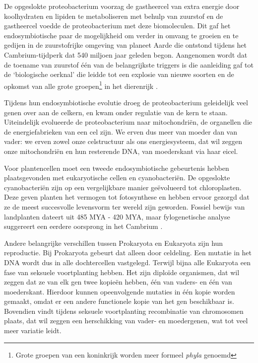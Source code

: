\documentclass[
  11pt,
]{book}
\begin{document}
De opgeslokte proteobacterium voorzag de gastheercel van extra energie door koolhydraten en lipiden te metaboliseren met behulp van zuurstof en de gastheercel voedde de proteobacterium met deze biomoleculen. Dit gaf het endosymbiotische paar de mogelijkheid om verder in omvang te groeien en te gedijen in de zuurstofrijke omgeving van planeet Aarde die ontstond tijdens het Cambrium-tijdperk dat 540 miljoen jaar geleden begon. Aangenomen wordt dat de toename van zuurstof één van de belangrijkste triggers is die aanleiding gaf tot de `biologische oerknal' die leidde tot een explosie van nieuwe soorten en de opkomst van alle grote groepen\footnote{Grote groepen van een koninkrijk worden meer formeel \emph{phyla} genoemd} in het dierenrijk \citep{he2019}.

Tijdens hun endosymbiotische evolutie droeg de proteobacterium geleidelijk veel genen over aan de celkern, en kwam onder regulatie van de kern te staan. Uiteindelijk evolueerde de proteobacterium naar mitochondriën, de organellen die de energiefabrieken van een cel zijn. We erven dus meer van moeder dan van vader: we erven zowel onze celstructuur als ons energiesysteem, dat wil zeggen onze mitochondriën en hun resterende DNA, van moederskant via haar eicel.

Voor plantencellen moet een tweede endosymbiotische gebeurtenis hebben plaatsgevonden met eukaryotische cellen en cyanobacteriën. De opgeslokte cyanobacteriën zijn op een vergelijkbare manier geëvolueerd tot chloroplasten. Deze geven planten het vermogen tot fotosynthese en hebben ervoor gezorgd dat ze de meest succesvolle levensvorm ter wereld zijn geworden. Fossiel bewijs van landplanten dateert uit 485 MYA - 420 MYA, maar fylogenetische analyse suggereert een eerdere oorsprong in het Cambrium \citep{StrotherFoster2021}.

Andere belangrijke verschillen tussen Prokaryota en Eukaryota zijn hun reproductie. Bij Prokaryota gebeurt dat alleen door celdeling. Een mutatie in het DNA wordt dus in alle dochtercellen vastgelegd. Terwijl bijna alle Eukaryota een fase van seksuele voortplanting hebben. Het zijn diploïde organismen, dat wil zeggen dat ze van elk gen twee kopieën hebben, één van vaders- en één van moederskant. Hierdoor kunnen opeenvolgende mutaties in één kopie worden gemaakt, omdat er een andere functionele kopie van het gen beschikbaar is. Bovendien vindt tijdens seksuele voortplanting recombinatie van chromosomen plaats, dat wil zeggen een herschikking van vader- en moedergenen, wat tot veel meer variatie leidt.
\end{document}
